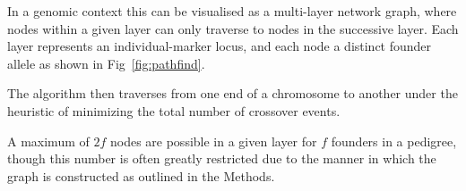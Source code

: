In a genomic context this can be visualised as a multi-layer network graph, where nodes within a given layer can only traverse to nodes in the successive layer. Each layer represents an individual-marker locus, and each node a distinct founder allele as shown in Fig~\ref{fig:pathfind}.

The algorithm then traverses from one end of a chromosome to another under the heuristic of minimizing the total number of crossover events.

A maximum of $2f$ nodes are possible in a given layer for $f$ founders in a pedigree, though this number is often greatly restricted due to the manner in which the graph is constructed as outlined in the Methods.